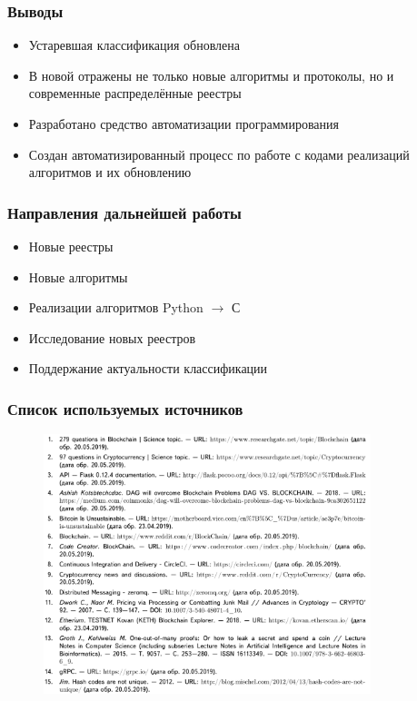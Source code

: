 \documentclass{beamer}
\begin{document}
\begin{frame}
    \frametitle{Выводы}
    \begin{itemize}
        \item[\checkmark] Устаревшая классификация обновлена
        \item[\checkmark] В новой отражены не только новые алгоритмы и
                          протоколы, но и современные распределённые реестры
        \item[\checkmark] Разработано средство автоматизации программирования
        \item[\checkmark] Создан автоматизированный процесс по работе с кодами
                          реализаций алгоритмов и их обновлению
    \end{itemize}
\end{frame}

\begin{frame}
    \frametitle{Направления дальнейшей работы}
    \begin{itemize}
        \item Новые реестры
        \item Новые алгоритмы
        \item Реализации алгоритмов Python $\rightarrow$ С
        \item Исследование новых реестров
        \item Поддержание актуальности классификации
    \end{itemize}
\end{frame}

\begin{frame}
    \frametitle{Список используемых источников}
    \begin{figure}
        \centering
        \includegraphics[width=0.85\textwidth]{lib1}
    \end{figure}
\end{frame}
\end{document}
